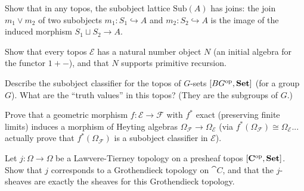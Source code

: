 \begin{exercise}
Show that in any topos, the subobject lattice $\mathrm{Sub}(A)$ has joins: the join $m_1 \vee m_2$ of two subobjects $m_1: S_1 \hookrightarrow A$ and $m_2: S_2 \hookrightarrow A$ is the image of the induced morphism $S_1 \sqcup S_2 \to A$.
\end{exercise}

\begin{exercise}
Show that every topos $\mathcal{E}$ has a natural number object $N$ (an initial algebra for the functor $1 + -$), and that $N$ supports primitive recursion.
\end{exercise}

\begin{exercise}[$\star$]
Describe the subobject classifier for the topos of $G$-sets $[BG^{\mathrm{op}}, \mathbf{Set}]$ (for a group $G$). What are the ``truth values'' in this topos? (They are the subgroups of $G$.)
\end{exercise}

\begin{exercise}[$\star$]
Prove that a geometric morphism $f: \mathcal{E} \to \mathcal{F}$ with $f^*$ exact (preserving finite limits) induces a morphism of Heyting algebras $\Omega_\mathcal{F} \to \Omega_\mathcal{E}$ (via $f^*(\Omega_\mathcal{F}) \cong \Omega_\mathcal{E}$... actually prove that $f^*(\Omega_\mathcal{F})$ is a subobject classifier in $\mathcal{E}$).
\end{exercise}

\begin{exercise}[$\star\star$]
Let $j: \Omega \to \Omega$ be a Lawvere-Tierney topology on a presheaf topos $[\mathbf{C}^{\mathrm{op}}, \mathbf{Set}]$. Show that $j$ corresponds to a Grothendieck topology on $\cat{C}$, and that the $j$-sheaves are exactly the sheaves for this Grothendieck topology.
\end{exercise}
